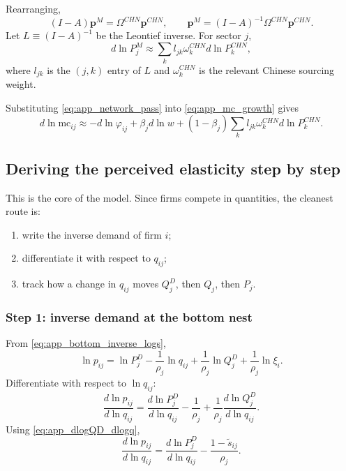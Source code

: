 Rearranging,
\[
(I-A)\mathbf{p}^M = \Omega^{CHN} \mathbf{p}^{CHN},
\qquad
\mathbf{p}^M = (I-A)^{-1} \Omega^{CHN} \mathbf{p}^{CHN}.
\]
Let $L \equiv (I-A)^{-1}$ be the Leontief inverse. For sector $j$,
\begin{equation}
d \ln P_j^M
\approx
\sum_k l_{jk} \omega_k^{CHN} d \ln P_k^{CHN},
\label{eq:app_network_pass}
\end{equation}
where $l_{jk}$ is the $(j,k)$ entry of $L$ and $\omega_k^{CHN}$ is the relevant Chinese sourcing weight.

Substituting \eqref{eq:app_network_pass} into \eqref{eq:app_mc_growth} gives
\begin{equation}
d \ln \text{mc}_{ij}
\approx
- d \ln \varphi_{ij}
+ \beta_j d \ln w
+ (1-\beta_j) \sum_k l_{jk} \omega_k^{CHN} d \ln P_k^{CHN}.
\label{eq:app_mc_reduced}
\end{equation}

\subsection{Deriving the perceived elasticity step by step}

This is the core of the model. Since firms compete in quantities, the cleanest route is:
\begin{enumerate}
    \item write the inverse demand of firm $i$;
    \item differentiate it with respect to $q_{ij}$;
    \item track how a change in $q_{ij}$ moves $Q_j^D$, then $Q_j$, then $P_j$.
\end{enumerate}

\subsubsection{Step 1: inverse demand at the bottom nest}

From \eqref{eq:app_bottom_inverse_logs},
\[
\ln p_{ij}
=
\ln P_j^D
- \frac{1}{\rho_j} \ln q_{ij}
+ \frac{1}{\rho_j} \ln Q_j^D
+ \frac{1}{\rho_j} \ln \xi_i.
\]
Differentiate with respect to $\ln q_{ij}$:
\begin{equation}
\frac{d \ln p_{ij}}{d \ln q_{ij}}
=
\frac{d \ln P_j^D}{d \ln q_{ij}}
- \frac{1}{\rho_j}
+ \frac{1}{\rho_j} \frac{d \ln Q_j^D}{d \ln q_{ij}}.
\label{eq:app_step1}
\end{equation}
Using \eqref{eq:app_dlogQD_dlogq},
\begin{equation}
\frac{d \ln p_{ij}}{d \ln q_{ij}}
=
\frac{d \ln P_j^D}{d \ln q_{ij}}
- \frac{1-\tilde{s}_{ij}}{\rho_j}.
\label{eq:app_step1_simplified}
\end{equation}

